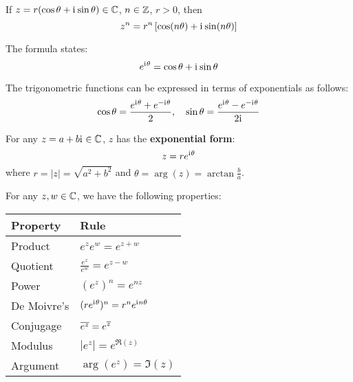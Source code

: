 \begin{theorem}
    If $z = r(\cos\theta + \mathrm{i}\mkern1mu\sin\theta)\in\mathbb{C}$, $n\in\mathbb{Z}$, $r>0$, then
    \[
        z^n = r^n\left[\cos(n\theta) + \mathrm{i}\mkern1mu\sin(n\theta)\right]
    \]
\end{theorem}

\begin{theorem}
    The formula states:
    \[
        e^{\mathrm{i}\mkern1mu\theta} = \cos\theta + \mathrm{i}\mkern1mu\sin\theta
    \]
\end{theorem}

\begin{corollary}
    The trigonometric functions can be expressed in terms of exponentials as follows:
    \[
        \cos\theta = \frac{e^{\mathrm{i}\mkern1mu\theta} + e^{-\mathrm{i}\mkern1mu\theta}}{2}, \quad
        \sin\theta = \frac{e^{\mathrm{i}\mkern1mu\theta} - e^{-\mathrm{i}\mkern1mu\theta}}{2\mathrm{i}\mkern1mu}
    \]
\end{corollary}

\begin{definition}
    For any $z=a+b\mathrm{i}\mkern1mu\in\mathbb{C}$, $z$ has the \textbf{exponential form}:
    \[
        z = re^{\mathrm{i}\mkern1mu\theta}
    \]
    where $r=|z|=\sqrt{a^2+b^2}$ and $\theta=\arg(z)=\arctan\frac{b}{a}$.
\end{definition}

\begin{theorem}
    For any $z, w\in\mathbb{C}$, we have the following properties:
    \begin{table}[H]
        \centering
        \begin{tabular}{ll}
            \textbf{Property} & \textbf{Rule} \\
            \hline
            Product & $e^z e^w=e^{z+w}$ \\
            Quotient & $\displaystyle\frac{e^z}{e^w} = e^{z-w}$ \\
            Power & $(e^z)^n = e^{nz}$ \\
            De Moivre's & $(re^{\mathrm{i}\mkern1mu\theta})^n = r^n e^{\mathrm{i}\mkern1mu n\theta}$ \\
            Conjugage & $\overline{e^z} = e^{\overline{z}}$ \\
            Modulus & $|e^z| = e^{\Re(z)}$ \\
            Argument & $\arg(e^z) = \Im(z)$
        \end{tabular}
    \end{table}
\end{theorem}